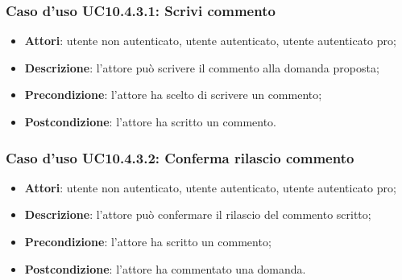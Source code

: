 \subsubsection{Caso d'uso UC10.4.3.1: Scrivi commento}
	\begin{itemize}
		\item \textbf{Attori}: utente non autenticato, utente autenticato, utente autenticato pro;
		\item \textbf{Descrizione}: l'attore può scrivere il commento alla domanda proposta;
		\item \textbf{Precondizione}: l'attore ha scelto di scrivere un commento;
		\item \textbf{Postcondizione}: l'attore ha scritto un commento.
	\end{itemize}
\subsubsection{Caso d'uso UC10.4.3.2: Conferma rilascio commento}
	\begin{itemize}
		\item \textbf{Attori}: utente non autenticato, utente autenticato, utente autenticato pro;
		\item \textbf{Descrizione}: l'attore può confermare il rilascio del commento scritto;
		\item \textbf{Precondizione}: l'attore ha scritto un commento;
		\item \textbf{Postcondizione}: l'attore ha commentato una domanda.
	\end{itemize}
